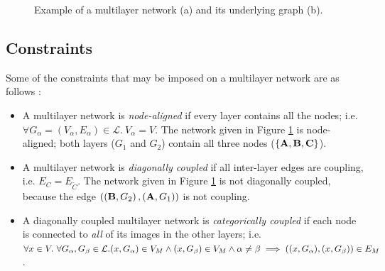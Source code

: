 \documentclass[12pt,a4paper,twoside,openright]{report}
\begin{document}
\begin{figure}[h]
{}
	\caption[Example of a multilayer network and its underlying graph]{\centering
	Example of a multilayer network (a) and its underlying graph (b).}
	\label{figmulyr}
\end{figure}

\subsection{Constraints}

Some of the constraints that may be imposed on a multilayer network are as follows \cite{kivela2014multilayer}:
\begin{itemize}
	\item A multilayer network is \emph{node-aligned} if every layer contains all the nodes; \linebreak i.e. $\forall G_\alpha = (V_\alpha, E_\alpha) \in \mathcal{L}.\ V_\alpha = V$. The network given in Figure \ref{figmulyr} is node-aligned; both layers ($G_1$ and $G_2$) contain all three nodes ($\left\{{\bf A}, {\bf B}, {\bf C}\right\}$).
	\item A multilayer network is \emph{diagonally coupled} if all inter-layer edges are coupling, \linebreak i.e. $E_C = E_{\widetilde{C}}$. The network given in Figure \ref{figmulyr} is not diagonally coupled, because the edge $\left(\left({\bf B}, G_2\right), \left({\bf A}, G_1\right)\right)$ is not coupling.
	\item A diagonally coupled multilayer network is \emph{categorically coupled} if each node is connected to \emph{all} of its images in the other layers; i.e. $\forall x \in V.\ \forall G_\alpha, G_\beta \in \mathcal{L}.\linebreak  (x, G_\alpha) \in V_M \wedge (x, G_\beta) \in V_M \wedge \alpha \neq \beta \implies ((x, G_\alpha), (x, G_\beta)) \in E_M$.
\end{itemize}
\end{document}
